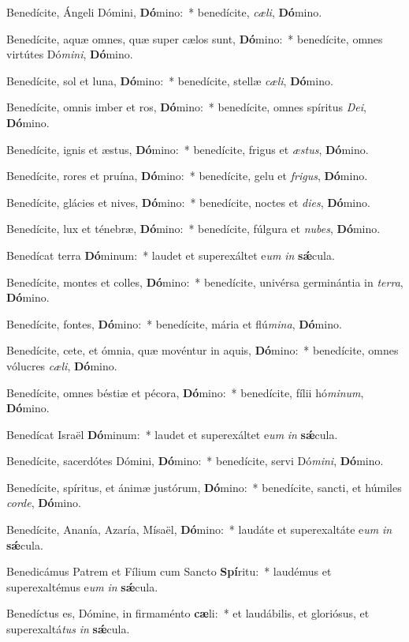 \item Benedícite, Ángeli Dómini, \textbf{Dó}mino:~* benedícite, \textit{cæ}\textit{li}, \textbf{Dó}mino.
\item Benedícite, aquæ omnes, quæ super cælos sunt, \textbf{Dó}mino:~* benedícite, omnes virtútes Dó\textit{mi}\textit{ni}, \textbf{Dó}mino.
\item Benedícite, sol et luna, \textbf{Dó}mino:~* benedícite, stellæ \textit{cæ}\textit{li}, \textbf{Dó}mino.
\item Benedícite, omnis imber et ros, \textbf{Dó}mino:~* benedícite, omnes spíritus \textit{De}\textit{i}, \textbf{Dó}mino.
\item Benedícite, ignis et æstus, \textbf{Dó}mino:~* benedícite, frigus et \textit{æs}\textit{tus}, \textbf{Dó}mino.
\item Benedícite, rores et pruína, \textbf{Dó}mino:~* benedícite, gelu et \textit{fri}\textit{gus}, \textbf{Dó}mino.
\item Benedícite, glácies et nives, \textbf{Dó}mino:~* benedícite, noctes et \textit{di}\textit{es}, \textbf{Dó}mino.
\item Benedícite, lux et ténebræ, \textbf{Dó}mino:~* benedícite, fúlgura et \textit{nu}\textit{bes}, \textbf{Dó}mino.
\item Benedícat terra \textbf{Dó}minum:~* laudet et superexáltet e\textit{um} \textit{in} \textbf{sǽ}cula.
\item Benedícite, montes et colles, \textbf{Dó}mino:~* benedícite, univérsa germinántia in \textit{ter}\textit{ra}, \textbf{Dó}mino.
\item Benedícite, fontes, \textbf{Dó}mino:~* benedícite, mária et flú\textit{mi}\textit{na}, \textbf{Dó}mino.
\item Benedícite, cete, et ómnia, quæ movéntur in aquis, \textbf{Dó}mino:~* benedícite, omnes vólucres \textit{cæ}\textit{li}, \textbf{Dó}mino.
\item Benedícite, omnes béstiæ et pécora, \textbf{Dó}mino:~* benedícite, fílii hó\textit{mi}\textit{num}, \textbf{Dó}mino.
\item Benedícat Israël \textbf{Dó}minum:~* laudet et superexáltet e\textit{um} \textit{in} \textbf{sǽ}cula.
\item Benedícite, sacerdótes Dómini, \textbf{Dó}mino:~* benedícite, servi Dó\textit{mi}\textit{ni}, \textbf{Dó}mino.
\item Benedícite, spíritus, et ánimæ justórum, \textbf{Dó}mino:~* benedícite, sancti, et húmiles \textit{cor}\textit{de}, \textbf{Dó}mino.
\item Benedícite, Ananía, Azaría, Mísaël, \textbf{Dó}mino:~* laudáte et superexaltáte e\textit{um} \textit{in} \textbf{sǽ}cula.
\item Benedicámus Patrem et Fílium cum Sancto \textbf{Spí}ritu:~* laudémus et superexaltémus e\textit{um} \textit{in} \textbf{sǽ}cula.
\item Benedíctus es, Dómine, in firmaménto \textbf{cæ}li:~* et laudábilis, et gloriósus, et superexaltá\textit{tus} \textit{in} \textbf{sǽ}cula.
